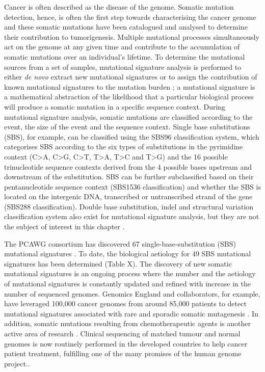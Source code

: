 Cancer is often described as the disease of the genome. Somatic mutation detection, hence, is often the first step towards characterising the cancer genome and these somatic mutations have been catalogued and analysed to determine their contribution to tumorigenesis. Multiple mutational processes simultaneously act on the genome at any given time and contribute to the accumulation of somatic mutations over an individual’s lifetime. To determine the mutational sources from a set of samples, mutational signature analysis is performed to either \textit{de novo} extract new mutational signatures or to assign the contribution of known mutational signatures to the mutation burden \cite{Alexandrov2013-fq}; a mutational signature is a mathematical abstraction of the likelihood that a particular biological process will produce a somatic mutation in a specific sequence context. During mutational signature analysis, somatic mutations are classified according to the event, the size of the event and the sequence context. Single base substitutions (SBS), for example, can be classified using the SBS96 classification system, which categorises SBS according to the six types of substitutions in the pyrimidine context (C>A, C>G, C>T, T>A, T>C and T>G) and the 16 possible trinucleotide sequence contexts derived from the 4 possible bases upstream and downstream of the substitution. SBS can be further subclassified based on their pentanucleotide sequence context (SBS1536 classification) and whether the SBS is located on the intergenic DNA, transcribed or untranscribed strand of the gene (SBS288 classification). Double base substitution, indel and structural variation classification system also exist for mutational signature analysis, but they are not the subject of interest in this chapter \cite{Alexandrov2013-fq, Li2020-vw, Steele2022-mn}. 

The PCAWG consortium has discovered 67 single-base-substitution (SBS) mutational signatures \cite{Alexandrov2020-ys}. To date, the biological aetiology for 49 SBS mutational signatures has been determined (Table X). The discovery of new somatic mutational signatures is an ongoing process where the number and the aetiology of mutational signatures is constantly updated and refined with increase in the number of sequenced genomes. Genomics England and collaborators, for example, have leveraged 100,000 cancer genomes from around 85,000 patients to detect mutational signatures associated with rare and sporadic somatic mutagenesis \cite{Degasperi2022-qe}. In addition, somatic mutations resulting from chemotherapeutic agents is another active area of research \cite{Pich2019-ja, Aitken2020-sa}. Clinical sequencing of matched tumour and normal genomes is now routinely performed in the developed countries to help cancer patient treatment, fulfilling one of the many promises of the human genome project..

